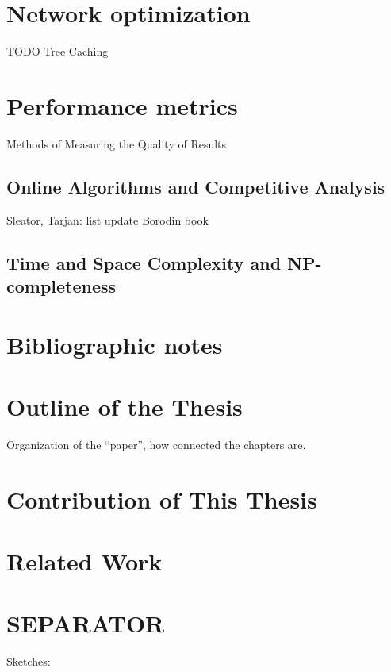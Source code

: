 \section{Network optimization}

TODO Tree Caching

\section{Performance metrics}

Methods of Measuring the Quality of Results

\subsection{Online Algorithms and Competitive Analysis}

Sleator, Tarjan: list update \cite{competitive-analysis}
Borodin book \cite{borodin-book}

\subsection{Time and Space Complexity and NP-completeness}


\section{Bibliographic notes}

\section{Outline of the Thesis}

Organization of the ``paper'', how connected the chapters are.

\section{Contribution of This Thesis}



\section{Related Work}




\section{SEPARATOR}
Sketches:
